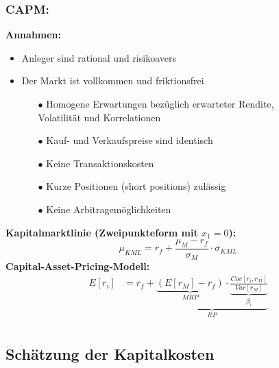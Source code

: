 \documentclass[leqno]{scrartcl}
\begin{document}
\begin{multicols}{4}
\subsubsection{CAPM:}
\textbf{Annahmen:}
  \begin{itemize}
    \item Anleger sind rational und risikoavers
    \item Der Markt ist vollkommen und friktionsfrei
    \begin{itemize}
      \item[$\bullet$] Homogene Erwartungen bezüglich erwarteter Rendite,\\ Volatilität und Korrelationen 
      \item[$\bullet$] Kauf- und Verkaufspreise sind identisch
      \item[$\bullet$] Keine Transaktionskosten
      \item[$\bullet$] Kurze Positionen (short positions) zulässig
      \item[$\bullet$] Keine Arbitragemöglichkeiten
    \end{itemize}
  \end{itemize} 
\textbf{Kapitalmarktlinie (Zweipunkteform mit $x_1=0$):}
  \begin{equation*}
    \mu_{KML} = r_f + \frac{\mu_M - r_f}{\sigma_M}\cdot \sigma_{KML}
  \end{equation*}
\textbf{Capital-Asset-Pricing-Modell:}
  \begin{equation*}
    \begin{split}
      E[r_i] &= r_f +  \underbrace{\underbrace{(E[r_M] - r_f)}_{MRP} \cdot \underbrace{\frac{Cov[r_i,r_M]}{Var[r_M]}}_{\beta_i}}_{RP}\\
    \end{split}
  \end{equation*}

\subsection{Schätzung der Kapitalkosten}

  \begin{equation*}
  \end{equation*}
  \begin{equation*}
  \end{equation*}



\end{multicols}
\end{document}

